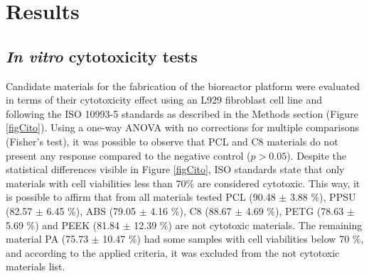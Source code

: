 \section{Results}

\subsection{\textit{In vitro} cytotoxicity tests}
Candidate materials for the fabrication of the bioreactor platform were evaluated in terms of their cytotoxicity effect using an L929 fibroblast cell line and following the ISO 10993-5 standards as described in the Methods section (Figure \ref{figCito}). Using a one-way ANOVA with no corrections for multiple comparisons (Fisher’s test), it was possible to observe that \acs{PCL} and \acs{C8} materials do not present any response compared to the negative control ($p>0.05$). Despite the statistical differences visible in Figure \ref{figCito}, ISO standards state that only materials with cell viabilities less than 70\% are considered cytotoxic. This way, it is possible to affirm that from all materials tested \acs{PCL} (90.48 $\pm$ 3.88 \%), PPSU (82.57 $\pm$ 6.45 \%), ABS (79.05 $\pm$ 4.16 \%), C8 (88.67 $\pm$ 4.69 \%), PETG (78.63 $\pm$ 5.69 \%) and PEEK (81.84 $\pm$ 12.39 \%) are not cytotoxic materials. The remaining material PA (75.73 $\pm$ 10.47 \%) had some samples with cell viabilities below 70 \%, and according to the applied criteria, it was excluded from the not cytotoxic materials list. 

